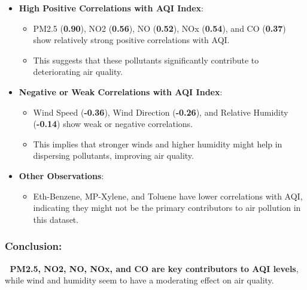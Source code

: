 \documentclass[11pt]{article}
\providecommand{\tightlist}{%
      \setlength{\itemsep}{0pt}\setlength{\parskip}{0pt}}
\begin{document}
\begin{itemize}
\tightlist
\item
  \textbf{High Positive Correlations with AQI Index}:

  \begin{itemize}
  \tightlist
  \item
    PM2.5 (\textbf{0.90}), NO2 (\textbf{0.56}), NO (\textbf{0.52}), NOx
    (\textbf{0.54}), and CO (\textbf{0.37}) show relatively strong
    positive correlations with AQI.
  \item
    This suggests that these pollutants significantly contribute to
    deteriorating air quality.
  \end{itemize}
\item
  \textbf{Negative or Weak Correlations with AQI Index}:

  \begin{itemize}
  \tightlist
  \item
    Wind Speed (\textbf{-0.36}), Wind Direction (\textbf{-0.26}), and
    Relative Humidity (\textbf{-0.14}) show weak or negative
    correlations.
  \item
    This implies that stronger winds and higher humidity might help in
    dispersing pollutants, improving air quality.
  \end{itemize}
\item
  \textbf{Other Observations}:

  \begin{itemize}
  \tightlist
  \item
    Eth-Benzene, MP-Xylene, and Toluene have lower correlations with
    AQI, indicating they might not be the primary contributors to air
    pollution in this dataset.
  \end{itemize}
\end{itemize}

\hypertarget{conclusion}{%
\subsubsection{Conclusion:}\label{conclusion}}

🔹 \textbf{PM2.5, NO2, NO, NOx, and CO are key contributors to AQI
levels}, while wind and humidity seem to have a moderating effect on air
quality.
\end{document}
